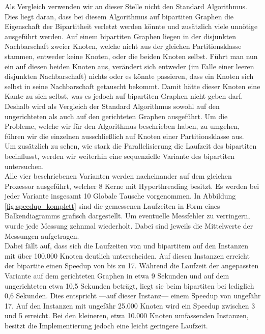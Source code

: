 Als Vergleich verwenden wir an dieser Stelle nicht 
den Standard \gc{} Algorithmus. Dies liegt daran, 
dass bei diesem Algorithmus auf bipartiten Graphen die Eigenschaft der
Bipartitheit verletzt werden könnte und zusätzlich viele unnötige  ausgeführt werden. 
Auf einem bipartiten Graphen liegen in der disjunkten Nachbarschaft zweier Knoten, 
welche nicht aus der gleichen Partitionsklasse stammen, entweder keine Knoten,
 oder die beiden Knoten selbst. 
Führt man nun ein \ct{} auf diesen beiden Knoten aus, verändert sich entweder (im Falle einer leeren disjunkten
Nachbarschaft) nichts
oder es könnte passieren, dass ein Knoten sich selbst in seine Nachbarschaft getauscht bekommt.
Damit hätte dieser Knoten eine Kante zu sich selbst, was es jedoch auf bipartiten Graphen nicht 
geben darf.
\\

Deshalb wird als Vergleich der Standard \cb{} Algorithmus \cite{DBLP:conf/esa/CarstensH0PTW18}
sowohl auf den ungerichteten als auch auf den gerichteten Graphen ausgeführt.
Um die Probleme, welche wir für den \gc{} Algorithmus beschrieben haben, zu umgehen, 
führen wir die einzelnen  ausschließlich auf Knoten einer Partitionsklasse aus.
\\

Um zusätzlich zu sehen, wie stark die Parallelisierung die Laufzeit des bipartiten
\gc{} beeinflusst, werden wir weiterhin eine sequenzielle Variante des bipartiten \gc{} 
untersuchen.
\\

Alle vier beschriebenen Varianten werden nacheinander auf dem gleichen Prozessor ausgeführt, welcher 8
Kerne mit Hyperthreading besitzt. Es werden bei jeder Variante insgesamt 10 Globale Tausche vorgenommen.
In Abbildung \ref{fig:speedup_komplett} sind die gemessenen Laufzeiten in Form
eines Balkendiagramms grafisch dargestellt.
Um eventuelle Messfehler zu verringern, wurde jede Messung zehnmal 
wiederholt. Dabei sind jeweils die Mittelwerte der Messungen aufgetragen.
\\

Dabei fällt auf, dass sich die Laufzeiten von \cb{} und bipartitem \gc{} auf den
Instanzen mit über 100.000 Knoten deutlich unterscheiden. Auf diesen Instanzen erreicht
der bipartite \gc{} einen Speedup von bis zu 17. 
Während die Laufzeit der angepassten \cb{} Variante auf dem gerichteten Graphen in etwa 9 Sekunden
und auf dem ungerichteten etwa 10,5 Sekunden beträgt, liegt sie beim bipartiten \gc{} bei lediglich 
0,6 Sekunden. Dies entspricht ---auf dieser Instanz---  einem Speedup von ungefähr 17.
Auf den Instanzen mit ungefähr 25.000 Knoten wird ein Speedup zwischen 3 und 5 erreicht.
Bei den kleineren, etwa 10.000 Knoten umfassenden Instanzen, besitzt die \cb{} Implementierung jedoch 
eine leicht geringere Laufzeit.
\\

